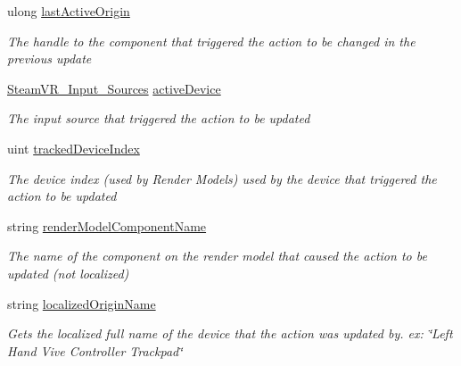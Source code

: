 \begin{DoxyCompactItemize}
ulong \mbox{\hyperlink{interface_valve_1_1_v_r_1_1_i_steam_v_r___action___in___source_a96b5ca1f6b126ef0b1ddda76abdc3535}{last\+Active\+Origin}}
\begin{DoxyCompactList}\small\item\em The handle to the component that triggered the action to be changed in the previous update \end{DoxyCompactList}\item 
\mbox{\hyperlink{namespace_valve_1_1_v_r_a82e5bf501cc3aa155444ee3f0662853f}{Steam\+V\+R\+\_\+\+Input\+\_\+\+Sources}} \mbox{\hyperlink{interface_valve_1_1_v_r_1_1_i_steam_v_r___action___in___source_abf4ed89526fde73c6142fbd458bc1eb8}{active\+Device}}
\begin{DoxyCompactList}\small\item\em The input source that triggered the action to be updated \end{DoxyCompactList}\item 
uint \mbox{\hyperlink{interface_valve_1_1_v_r_1_1_i_steam_v_r___action___in___source_a5dbae568b5daf1cfd3b529b00750caae}{tracked\+Device\+Index}}
\begin{DoxyCompactList}\small\item\em The device index (used by Render Models) used by the device that triggered the action to be updated \end{DoxyCompactList}\item 
string \mbox{\hyperlink{interface_valve_1_1_v_r_1_1_i_steam_v_r___action___in___source_aed8fb392a34de9c8840578c4a3f6a9ba}{render\+Model\+Component\+Name}}
\begin{DoxyCompactList}\small\item\em The name of the component on the render model that caused the action to be updated (not localized) \end{DoxyCompactList}\item 
string \mbox{\hyperlink{interface_valve_1_1_v_r_1_1_i_steam_v_r___action___in___source_abfb307a430eb5946c905d07bec79b2aa}{localized\+Origin\+Name}}
\begin{DoxyCompactList}\small\item\em Gets the localized full name of the device that the action was updated by. ex\+: \char`\"{}\+Left Hand Vive Controller Trackpad\char`\"{} \end{DoxyCompactList}\end{DoxyCompactItemize}


